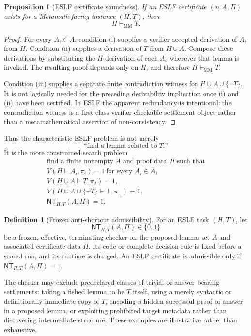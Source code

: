 \documentclass[11pt]{article}
\newtheorem{proposition}[theorem]{Proposition}
\theoremstyle{definition}
\newtheorem{definition}[theorem]{Definition}
\begin{document}
\begin{proposition}[ESLF certificate soundness]
If an ESLF certificate $(n,A,\Pi)$ exists for a Metamath-facing instance $(H,T)$, then
\[
\boxed{H\vdash_{\mathrm{MM}}T.}
\]
\end{proposition}

\begin{proof}
For every $A_i\in A$, condition (i) supplies a verifier-accepted derivation of $A_i$ from $H$. Condition (ii) supplies a derivation of $T$ from $H\cup A$. Compose these derivations by substituting the $H$-derivation of each $A_i$ wherever that lemma is invoked. The resulting proof depends only on $H$, and therefore $H\vdash_{\mathrm{MM}}T$.

Condition (iii) supplies a separate finite contradiction witness for $H\cup A\cup\{\neg T\}$. It is not logically needed for the preceding derivability implication once (i) and (ii) have been certified. In ESLF the apparent redundancy is intentional: the contradiction witness is a first-class verifier-checkable settlement object rather than a metamathematical assertion of non-consistency.
\end{proof}

Thus the characteristic ESLF problem is not merely
\[
\text{``find a lemma related to }T\text{.''}
\]
It is the more constrained search problem
\[
\boxed{\begin{gathered}
\text{find a finite nonempty }A\text{ and proof data }\Pi\text{ such that}\\
V(H\vdash A_i,\pi_i)=1\ \text{for every }A_i\in A,\\
V(H\cup A\vdash T,\pi_T)=1,\\
V(H\cup A\cup\{\neg T\}\vdash\bot,\pi_\bot)=1,\\
\mathsf{NT}_{H,T}(A,\Pi)=1.
\end{gathered}}
\]

\begin{definition}[Frozen anti-shortcut admissibility]
For an ESLF task $(H,T)$, let
\[
\mathsf{NT}_{H,T}(A,\Pi)\in\{0,1\}
\]
be a frozen, effective, terminating checker on the proposed lemma set $A$ and associated certificate data $\Pi$. Its code or complete decision rule is fixed before a scored run, and its runtime is charged. An ESLF certificate is admissible only if $\mathsf{NT}_{H,T}(A,\Pi)=1$.

The checker may exclude predeclared classes of trivial or answer-bearing settlements: taking a fished lemma to be $T$ itself, using a merely syntactic or definitionally immediate copy of $T$, encoding a hidden successful proof or answer in a proposed lemma, or exploiting prohibited target metadata rather than discovering intermediate structure. These examples are illustrative rather than exhaustive.
\end{definition}
\end{document}
